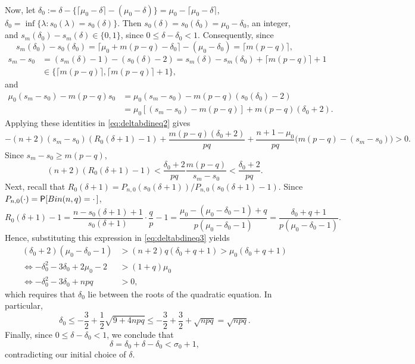 \documentclass[11pt,draft]{article}
\begin{document}
\begin{pf}
\begin{align}
\end{align}
Now, let
$\delta_0 :=
\delta - \{\lceil \mu_0 - \delta \rceil - (\mu_0 - \delta)\} =
\mu_0 - \lceil \mu_0 - \delta \rceil$, \ie
$\delta_0 = \inf\{ \lambda : s_0(\lambda) = s_0(\delta)\}$.
Then $s_0(\delta) = s_0(\delta_0) = \mu_0 - \delta_0$, an integer, and
$s_m(\delta_0) - s_m(\delta) \in\{0, 1\}$, since
$0 \leq \delta-\delta_0 < 1$.
Consequently,
since
\[ s_m(\delta_0) - s_0(\delta_0) = \lceil \mu_0  + m(p-q) - \delta_0 \rceil -
(\mu_0 - \delta_0) = \lceil m(p-q) \rceil, \]
\begin{align*}
s_m - s_0 &= (s_m(\delta) - 1) - (s_0(\delta) - 2) =
s_m(\delta) - s_m(\delta_0) + \lceil m(p-q) \rceil + 1 \\
 &\in \big\{\lceil m(p-q) \rceil, \lceil m(p-q) \rceil + 1 \big\},
\end{align*}
and
\begin{align*}
\mu_0(s_m - s_0) - m(p-q) s_0 & = \mu_0(s_m-s_0) - m(p-q)(s_0(\delta_0) - 2) \\
 &= \mu_0[(s_m-s_0) - m(p-q)] + m(p-q)(\delta_0 + 2).
\end{align*}
Applying these identities in \eqref{eq:deltabdineq2} gives
\[ 
-(n+2)(s_m - s_0)(R_0(\delta + 1) - 1) +
\frac{m(p-q)(\delta_0 + 2)}{pq}
+ \frac{n+1-\mu_0}{pq}\big(m(p-q) - (s_m-s_0)\big) > 0.
\]
Since $s_m-s_0 \geq m(p-q)$,
\begin{equation}\label{eq:deltabdineq3}
(n+2)(R_0(\delta+1) - 1) <
\frac{\delta_0 + 2}{pq}\frac{m(p-q)}{s_m - s_0} < \frac{\delta_0 + 2}{pq}.
\end{equation}
Next, recall that
$R_0(\delta+1) = P_{n,0}(s_0(\delta+1)) / P_{n,0}(s_0(\delta+1) - 1)$.
Since $P_{n,0}(\cdot) = \P[Bin(n,q) = \cdot\,]$, 
\[ R_0(\delta+1) - 1 =
\frac{n - s_0(\delta+1) + 1}{s_0(\delta+1)}\cdot \frac{q}{p} - 1 =
\frac{\mu_0 - (\mu_0 - \delta_0 - 1) + q}{p(\mu_0 - \delta_0 - 1)} =
\frac{\delta_0 + q + 1}{p(\mu_0 - \delta_0 - 1)}.
\]
Hence, substituting this expression in \eqref{eq:deltabdineq3} yields
\begin{align*}
(\delta_0 + 2)(\mu_0 - \delta_0 - 1) &> (n+2)q(\delta_0 + q + 1) >
\mu_0(\delta_0 + q + 1) \\
\iff
-\delta_0^2 - 3\delta_0 + 2\mu_0 - 2 &>  (1+q)\mu_0 \\
\iff
-\delta_0^2 - 3\delta_0 + npq &> 0,
\end{align*}
which requires that $\delta_0$ lie between the roots of the quadratic equation.
In particular,
\[ \delta_0 \leq -\frac{3}{2} + \frac{1}{2}\sqrt{9 + 4npq} \leq
-\frac{3}{2} + \frac{3}{2} + \sqrt{npq} = \sqrt{npq}. \]
Finally, since $0 \leq \delta-\delta_0 < 1$, we conclude that
\[ \delta = \delta_0 + \delta - \delta_0 < \sigma_0 + 1, \]
contradicting our initial choice of $\delta$.
\end{pf}
\end{document}
